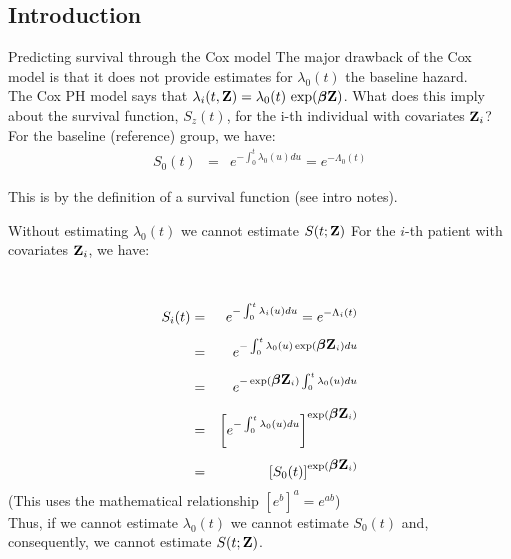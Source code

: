 \documentclass[envcountsect, 10pt, portrait, palatino]{beamer}
\newcommand{\bfbeta}{{\mbox{\boldmath$\beta$}}}
\newcommand{\bfZ}{{\mbox{{\bf Z}}}}
\begin{document}
\subsection{Introduction}
\begin{frame}{Predicting survival through the Cox model}
The major drawback of the Cox model is that it does not provide estimates for $\lambda_0(t)$ the baseline hazard.\\[2ex]
The Cox PH model says that
$\lambda_i(t,\bfZ)=\lambda_0(t) \,\exp(\bfbeta \bfZ)$.
What does this imply about the survival function, $S_z(t)$, for
the i-th individual with covariates $\bfZ_i$?
\\[2ex]
For the baseline (reference) group, we have:
\begin{eqnarray*}
S_0(t) & = & e^{- \int_0^t \lambda_0(u) du} = e^{-\Lambda_0(t)}
\end{eqnarray*}

This is by the definition of a survival function (see intro notes).

\end{frame}
\begin{frame}{Without estimating $\lambda_0(t)$ we cannot estimate $S(t;\bfZ)$}
For the $i$-th patient with covariates $\bfZ_i$, we have:

\vspace{-0.3in}
\
\begin{eqnarray*}
S_i(t) & = & e^{- \int_0^t \lambda_i(u) du} = e^{-\Lambda_i(t)}
\nonumber \\[1ex]
       & = & e^{- \int_0^t \lambda_0(u) \exp(\bfbeta \bfZ_i) du}
\nonumber \\[1ex]
       & = & e^{- \exp(\bfbeta \bfZ_i) \int_0^t \lambda_0(u) du}
\nonumber  \\[1ex]
       & = & \left[e^{- \int_0^t \lambda_0(u) du}\right]^{\exp(\bfbeta\bfZ_i)}
\nonumber \\[1ex]
       & = & \left[S_0(t)\right]^{\exp(\bfbeta\bfZ_i)}
\end{eqnarray*}
(This uses the mathematical relationship $[e^b]^a = e^{ab}$)\\[2ex]
Thus, if we cannot estimate $\lambda_0(t)$ we cannot estimate $S_0(t)$ and, consequently, we cannot estimate $S(t;\bfZ)$.
\end{frame}
\end{document}
